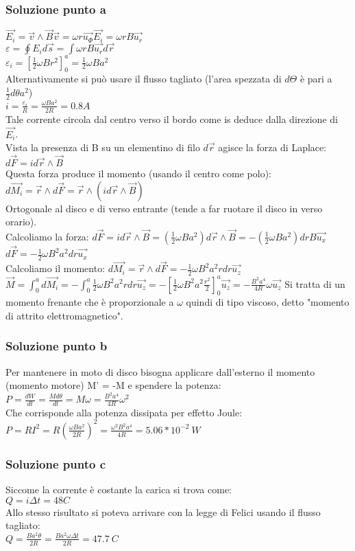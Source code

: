 \documentclass[../../main.tex]{subfiles}
\begin{document}
\subsubsection*{Soluzione punto a}
$\vec{E_i} = \vec{v}\wedge\vec{B}$\tab\tab$\vec{v} = \omega r\vec{u_\Phi}$\tab\tab$\vec{E_i} = \omega r B \vec{u_r}$\\
$\varepsilon = \oint E_i d\vec{s} = \int \omega rB\vec{u_r}d\vec{r}$\\
$\varepsilon_i = \left[\frac{1}{2}\omega Br^2\right]^a_0 = \frac{1}{2}\omega Ba^2$\\
Alternativamente si può usare il flusso tagliato (l'area spezzata di $d\Theta$ è pari a $\frac{1}{2}d\theta a^2$)\\
$i = \frac{\varepsilon_i}{R} = \frac{\omega Ba^2}{2R} = 0.8 A$\\
Tale corrente circola dal centro verso il bordo come is deduce dalla direzione di $\vec{E_i}$.\\
Vista la presenza di B su un elementino di filo $d\vec{r}$ agisce la forza di Laplace: $d\vec{F} = id\vec{r}\wedge\vec{B}$ \\
Questa forza produce il momento (usando il centro come polo): $d\vec{M_i} = \vec{r}\wedge d\vec{F} = \vec{r} \wedge (id\vec{r}\wedge\vec{B})$\\
Ortogonale al disco e di verso entrante (tende a far ruotare il disco in verso orario).\\
Calcoliamo la forza: $d\vec{F} = id\vec{r}\wedge\vec{B} = \left(\frac{1}{2}\omega Ba^2\right) d\vec{r}\wedge\vec{B} = -\left(\frac{1}{2}\omega Ba^2\right) drB\vec{u_x}$\\
$d\vec{F} = -\frac{1}{2}\omega B^2a^2dr\vec{u_x}$\\
Calcoliamo il momento: $d\vec{M_i} = \vec{r}\wedge d\vec{F} = -\frac{1}{2}\omega B^2a^2rdr \vec{u_z}$\\
$\vec{M} = \int_0^a d\vec{M_i} = -\int_0^a\frac{1}{2}\omega B^2a^2rdr\vec{u_z} = -\left[\frac{1}{2}\omega B^2a^2\frac{r^2}{2}\right]_0^a\vec{u_z} = -\frac{B^2a^4}{4R}\omega\vec{u_z}$
Si tratta di un momento frenante che è proporzionale a $\omega$ quindi di tipo viscoso, detto "momento di attrito elettromagnetico".
\subsubsection*{Soluzione punto b}
Per mantenere in moto di disco bisogna applicare dall'esterno il momento (momento motore) M' = -M e spendere la potenza:\\
$P = \frac{dW}{dt} = \frac{M d\theta}{dt} = M\omega = \frac{B^2a^4}{4R}\omega^2$\\
Che corrisponde alla potenza dissipata per effetto Joule:\\
$P = RI^2 = R\left(\frac{\omega Ba^2}{2R}\right)^2=\frac{\omega^2 B^2a^4}{4R} = 5.06 * 10^{-2}\ W$
\subsubsection*{Soluzione punto c}
Siccome la corrente è costante la carica si trova come:\\
$Q = i \Delta t= 48C$\\
Allo stesso risultato si poteva arrivare con la legge di Felici usando il flusso tagliato:\\
$Q = \frac{Ba^2\theta}{2R} = \frac{Ba^2\omega \Delta t}{2R} = 47.7\ C$
\newpage
\end{document}
